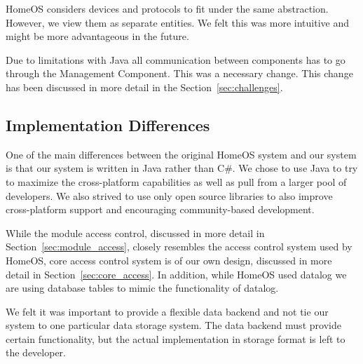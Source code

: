 HomeOS considers devices and protocols to fit under the same abstraction.
However, we view them as separate entities. We felt this was more intuitive and
might be more advantageous in the future.  

Due to limitations with Java all communication between components has to go
through the Management Component. This was a necessary change. This change has 
been discussed in more detail in the Section~\ref{sec:challenges}.
\subsection{Implementation Differences}
\label{sec:impldiff} 
One of the main differences between the original HomeOS system and our system is
that our system is written in Java rather than C#. We chose to use Java to try
to maximize the cross-platform capabilities as well as pull from a larger pool
of developers. We also strived to use only open source libraries to also improve
cross-platform support and encouraging community-based development.

While the module access control, discussed in more detail in
Section~\ref{sec:module_access}, closely resembles the access control system
used by HomeOS, core access control system is of our own design, discussed in
more detail in Section~\ref{sec:core_access}. In addition, while HomeOS used
datalog we are using database tables to mimic the functionality of datalog.

We felt it was important to provide a flexible data backend and not tie our
system to one particular data storage system. The data backend must provide
certain functionality, but the actual implementation in storage format is left 
to the developer.
